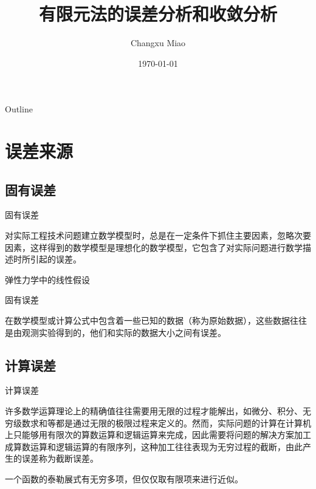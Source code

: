 \documentclass[11pt]{beamer}
\begin{document}
\author{Changxu Miao}
\title[有限元法的误差分析和收敛分析]{有限元法的误差分析和收敛分析}
\subtitle{}
\date{\today}
\frame[plain]{\maketitle}

\begin{frame}{Outline}
\tableofcontents %
\end{frame}



\section{误差来源}
\subsection{固有误差}
\begin{frame}{固有误差}
\begin{theorem}[模型误差]
对实际工程技术问题建立数学模型时，总是在一定条件下抓住主要因素，忽略次要因素，这样得到的数学模型是理想化的数学模型，它包含了对实际问题进行数学描述时所引起的误差。
\end{theorem}
\begin{example}
弹性力学中的线性假设
\end{example}
\end{frame}

\begin{frame}{固有误差}
\begin{theorem}[观测误差]
在数学模型或计算公式中包含着一些已知的数据（称为原始数据），这些数据往往是由观测实验得到的，他们和实际的数据大小之间有误差。
\end{theorem}
\end{frame}

\subsection{计算误差}
\begin{frame}{计算误差}
\begin{theorem}[截断误差]
许多数学运算理论上的精确值往往需要用无限的过程才能解出，如微分、积分、无穷级数求和等都是通过无限的极限过程来定义的。然而，实际问题的计算在计算机上只能够用有限次的算数运算和逻辑运算来完成，因此需要将问题的解决方案加工成算数运算和逻辑运算的有限序列，这种加工往往表现为无穷过程的截断，由此产生的误差称为截断误差。
\end{theorem}
\begin{example}
一个函数的泰勒展式有无穷多项，但仅仅取有限项来进行近似。
\end{example}
\end{frame}
\end{document}
